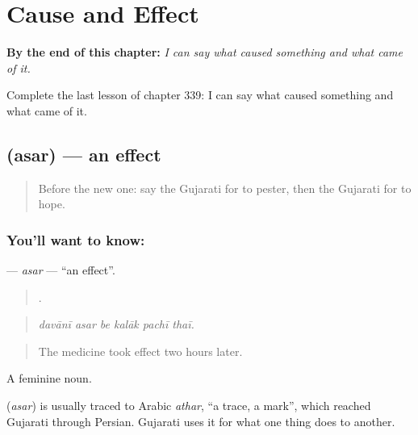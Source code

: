 
\chapter{Cause and Effect}
\label{ch:gu-cause-and-effect}

\begin{chapteropening}
\textbf{By the end of this chapter:} \emph{I can say what caused something and what came of it.}

Complete the last lesson of chapter 339: I can say what caused something and what came of it.
\end{chapteropening}

\section[\texorpdfstring{\gu{અસર} (asar)}{અસર (asar)}]{ (asar) — an effect}

\label{lesson:GU-C339-asar}



\begin{quote}
Before the new one: say the Gujarati for to pester, then the Gujarati for to hope.
\end{quote}

\subsection*{You'll want to know: }
\textbf{} — \emph{asar} — \textquotedblleft{}an effect\textquotedblright{}.

\begin{quote}
     .
\end{quote}

\begin{quote}
\emph{davānī asar be kalāk pachī thaī.}
\end{quote}

\begin{quote}
The medicine took effect two hours later.
\end{quote}

A feminine noun.

\begin{cousinweb}
\textbf{} (\emph{asar}) is usually traced to Arabic \emph{athar}, \textquotedblleft{}a trace, a mark\textquotedblright{}, which reached Gujarati through Persian. Gujarati uses it for what one thing does to another.
\end{cousinweb}

